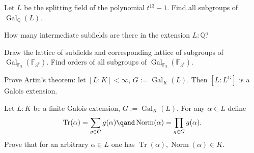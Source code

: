 \documentclass{article}
\begin{document}
\setcounter{section}{9} %
\begin{subexercise} \label{qs:1a} %
Let \( L \) be the splitting field of the polynomial \( t^{13} - 1 \). Find all subgroups of \( \operatorname{Gal}_{\mathbb{Q}}(L) \).
\end{subexercise}
\begin{solution}

\end{solution}
\pagebreak

\begin{subexercise} \label{qs:1b} %
How many intermediate subfields are there in the extension \( L : \mathbb{Q} \)?
\end{subexercise}
\begin{solution}

\end{solution}
\pagebreak

\begin{exercise} \label{qs:2} %
Draw the lattice of subfields and corresponding lattice of subgroups of \( \operatorname{Gal}_{\mathbb{F}_3}(\mathbb{F}_{3^8}) \). Find orders of all subgroups of \( \operatorname{Gal}_{\mathbb{F}_3}(\mathbb{F}_{3^8}) \).
\end{exercise}
\begin{solution}

\end{solution}
\pagebreak

\begin{exercise} \label{qs:3} %
Prove Artin's theorem: let \( [L : K] < \infty \), \( G := \operatorname{Gal}_K(L) \). Then \( [L : L^G] \) is a Galois extension.
\end{exercise}
\begin{solution}

\end{solution}
\pagebreak

\begin{exercise} \label{qs:4} %
Let \( L : K \) be a finite Galois extension, \( G := \operatorname{Gal}_K(L) \). For any \( \alpha \in L \) define
\begin{align*}
\operatorname{Tr}(\alpha) = \sum_{g \in G} g(\alpha) \qand \operatorname{Norm}(\alpha) = \prod_{g \in G} g(\alpha).
\end{align*}
Prove that for an arbitrary \( \alpha \in L \) one has \( \operatorname{Tr}(\alpha), \operatorname{Norm}(\alpha) \in K \).
\end{exercise}
\begin{solution}

\end{solution}
\pagebreak
\end{document}

